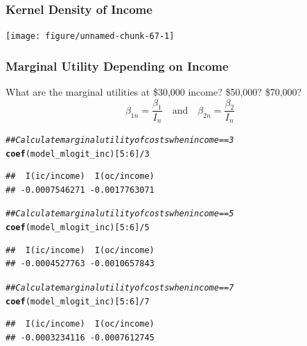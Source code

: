 \documentclass{beamer}\usepackage[]{graphicx}\usepackage[]{color}
\makeatletter
\newcommand{\hlnum}[1]{\textcolor[rgb]{0.686,0.059,0.569}{#1}}%
\newcommand{\hlcom}[1]{\textcolor[rgb]{0.678,0.584,0.686}{\textit{#1}}}%
\newcommand{\hlopt}[1]{\textcolor[rgb]{0,0,0}{#1}}%
\newcommand{\hlstd}[1]{\textcolor[rgb]{0.345,0.345,0.345}{#1}}%
\newcommand{\hlkwd}[1]{\textcolor[rgb]{0.737,0.353,0.396}{\textbf{#1}}}%
\newenvironment{kframe}{%
 \def\at@end@of@kframe{}%
 \ifinner\ifhmode%
  \def\at@end@of@kframe{\end{minipage}}%
  \begin{minipage}{\columnwidth}%
 \fi\fi%
 \def\FrameCommand##1{\hskip\@totalleftmargin \hskip-\fboxsep
 \colorbox{shadecolor}{##1}\hskip-\fboxsep
     \hskip-\linewidth \hskip-\@totalleftmargin \hskip\columnwidth}%
 \MakeFramed {\advance\hsize-\width
   \@totalleftmargin\z@ \linewidth\hsize
   \@setminipage}}%
 {\par\unskip\endMakeFramed%
 \at@end@of@kframe}
\newenvironment{knitrout}{}{} %
\makeatother
\begin{document}
\begin{frame}[fragile]\frametitle{Kernel Density of Income}
\begin{knitrout}\footnotesize
{}\color{fgcolor}

{\centering \texttt{[image: figure/unnamed-chunk-67-1]} 

}


\end{knitrout}
\end{frame}

\begin{frame}[fragile]\frametitle{Marginal Utility Depending on Income}
    What are the marginal utilities at \$30,000 income? \$50,000? \$70,000?
    $$\beta_{1n} = \frac{\beta_1}{I_n} \quad \text{and} \quad \beta_{2n} = \frac{\beta_2}{I_n}$$
\begin{knitrout}\footnotesize
{}\color{fgcolor}\begin{kframe}
\begin{alltt}
\hlcom{## Calculate marginal utility of costs when income == 3}
\hlkwd{coef}\hlstd{(model_mlogit_inc)[}\hlnum{5}\hlopt{:}\hlnum{6}\hlstd{]} \hlopt{/} \hlnum{3}
\end{alltt}
\begin{verbatim}
##  I(ic/income)  I(oc/income) 
## -0.0007546271 -0.0017763071
\end{verbatim}
\begin{alltt}
\hlcom{## Calculate marginal utility of costs when income == 5}
\hlkwd{coef}\hlstd{(model_mlogit_inc)[}\hlnum{5}\hlopt{:}\hlnum{6}\hlstd{]} \hlopt{/} \hlnum{5}
\end{alltt}
\begin{verbatim}
##  I(ic/income)  I(oc/income) 
## -0.0004527763 -0.0010657843
\end{verbatim}
\begin{alltt}
\hlcom{## Calculate marginal utility of costs when income == 7}
\hlkwd{coef}\hlstd{(model_mlogit_inc)[}\hlnum{5}\hlopt{:}\hlnum{6}\hlstd{]} \hlopt{/} \hlnum{7}
\end{alltt}
\begin{verbatim}
##  I(ic/income)  I(oc/income) 
## -0.0003234116 -0.0007612745
\end{verbatim}
\end{kframe}
\end{knitrout}
\end{frame}
\end{document}
